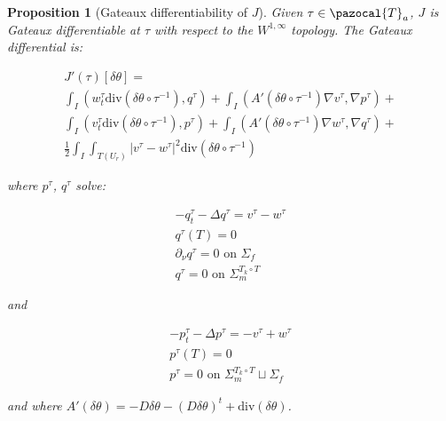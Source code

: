 \documentclass[english,a4paper,12pt,oneside]{scrbook}
\theoremstyle{break}
\newtheorem{prop}[equation]{Proposition}
\theoremstyle{remark}
\newcommand{\cT}{\pazocal{T}}
\newcommand{\te}{\theta}
\newcommand{\dive}{\text{div}}
\begin{document}
\begin{prop}[Gateaux differentiability of $J$]
Given $\tau \in \cT_a$, $J$ is Gateaux differentiable at $\tau$ with respect to the $W^{1,\infty}$ topology. The Gateaux differential is:


\begin{align*}
J'(\tau)[\delta \te] =\\ \int_I (w_t^\tau \dive(\delta \te\circ  \tau^{-1}), q^\tau )+ \int_I (A'(\delta\te \circ \tau^{-1})\nabla v^\tau, \nabla p^\tau)+\\
\int_I (v_t^\tau \dive(\delta \te\circ  \tau^{-1}), p^\tau )+ \int_I (A'(\delta\te \circ \tau^{-1})\nabla w^\tau, \nabla q^\tau)+\\
\frac{1}{2}\int_I\int_{T(U_r)}|v^\tau-w^\tau|^2\dive(\delta \te\circ  \tau^{-1})
\end{align*}

where $p^\tau$, $q^\tau$ solve:

\begin{align*}
-q^\tau_t-\Delta q^\tau =v^\tau-w^\tau\\
q^\tau(T)=0\\
\partial_\nu q^\tau = 0 \text{ on } \Sigma_f\\
q^\tau = 0 \text{ on } \Sigma_m^{T_k\circ T}
\end{align*}

and

\begin{align*}
-p^\tau_t-\Delta p^\tau = - v^\tau+ w^\tau \\
p^\tau(T)=0\\
p^\tau = 0 \text{ on } \Sigma_m^{T_k\circ T} \sqcup \Sigma_f
\end{align*}

and where $A'(\delta\te )= - D\delta \te -(D\delta\te)^t + \dive(\delta\te)$.

\end{prop}
\end{document}

